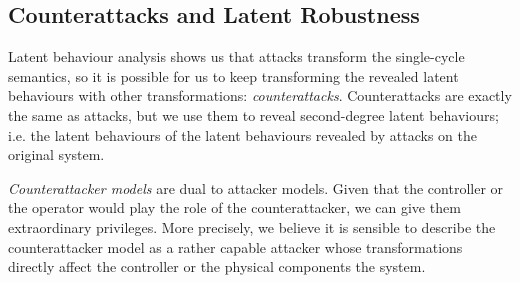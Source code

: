 {{\subsection{Counterattacks and Latent Robustness}
\label{sec:CounterAttacks}
Latent behaviour analysis shows us that attacks transform the single-cycle semantics, so it is possible for us to keep transforming the revealed latent behaviours with other transformations: \emph{counterattacks}. Counterattacks are exactly the same as attacks, but we use them to reveal second-degree latent behaviours; i.e. the latent behaviours of the latent behaviours revealed by attacks on the original system. 


\emph{Counterattacker models} are dual to attacker models. Given that the controller or the operator would play the role of the counterattacker, we can give them extraordinary privileges. More precisely, we believe it is sensible to describe the counterattacker model as a rather capable attacker whose transformations directly affect the controller or the physical components the system. 

}}
